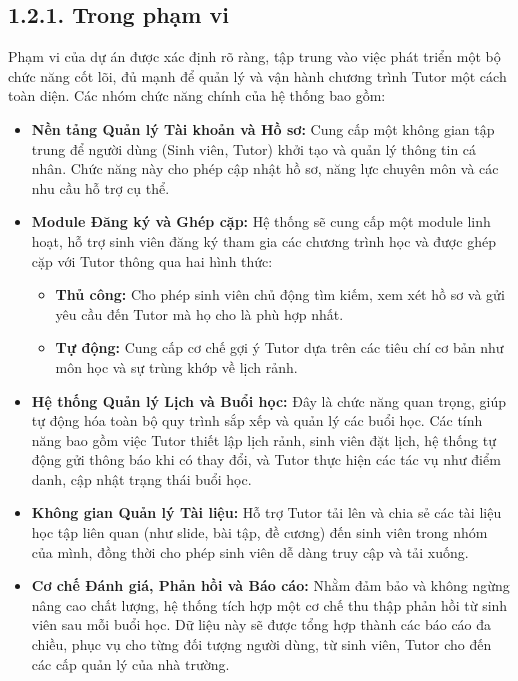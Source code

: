 \subsection*{1.2.1. Trong phạm vi}
Phạm vi của dự án được xác định rõ ràng, tập trung vào việc phát triển một bộ chức năng cốt lõi, đủ mạnh để quản lý và vận hành chương trình Tutor một cách toàn diện. Các nhóm chức năng chính của hệ thống bao gồm:
\begin{itemize}
    \item \textbf{Nền tảng Quản lý Tài khoản và Hồ sơ:} Cung cấp một không gian tập trung để người dùng (Sinh viên, Tutor) khởi tạo và quản lý thông tin cá nhân. Chức năng này cho phép cập nhật hồ sơ, năng lực chuyên môn và các nhu cầu hỗ trợ cụ thể.
    \item \textbf{Module Đăng ký và Ghép cặp:} Hệ thống sẽ cung cấp một module linh hoạt, hỗ trợ sinh viên đăng ký tham gia các chương trình học và được ghép cặp với Tutor thông qua hai hình thức:
    \begin{itemize}
        \item \textbf{Thủ công:} Cho phép sinh viên chủ động tìm kiếm, xem xét hồ sơ và gửi yêu cầu đến Tutor mà họ cho là phù hợp nhất.
        \item \textbf{Tự động:} Cung cấp cơ chế gợi ý Tutor dựa trên các tiêu chí cơ bản như môn học và sự trùng khớp về lịch rảnh.
    \end{itemize}
    \item \textbf{Hệ thống Quản lý Lịch và Buổi học:} Đây là chức năng quan trọng, giúp tự động hóa toàn bộ quy trình sắp xếp và quản lý các buổi học. Các tính năng bao gồm việc Tutor thiết lập lịch rảnh, sinh viên đặt lịch, hệ thống tự động gửi thông báo khi có thay đổi, và Tutor thực hiện các tác vụ như điểm danh, cập nhật trạng thái buổi học.
    \item \textbf{Không gian Quản lý Tài liệu:} Hỗ trợ Tutor tải lên và chia sẻ các tài liệu học tập liên quan (như slide, bài tập, đề cương) đến sinh viên trong nhóm của mình, đồng thời cho phép sinh viên dễ dàng truy cập và tải xuống.
    \item \textbf{Cơ chế Đánh giá, Phản hồi và Báo cáo:} Nhằm đảm bảo và không ngừng nâng cao chất lượng, hệ thống tích hợp một cơ chế thu thập phản hồi từ sinh viên sau mỗi buổi học. Dữ liệu này sẽ được tổng hợp thành các báo cáo đa chiều, phục vụ cho từng đối tượng người dùng, từ sinh viên, Tutor cho đến các cấp quản lý của nhà trường.
\end{itemize}

